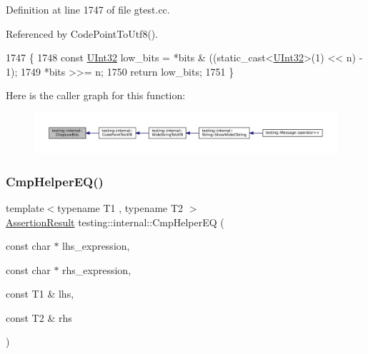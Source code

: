 Definition at line 1747 of file gtest.\+cc.



Referenced by Code\+Point\+To\+Utf8().


\begin{DoxyCode}
1747                                                \{
1748   \textcolor{keyword}{const} \hyperlink{namespacetesting_1_1internal_a40d4fffcd2bf56f18b1c380615aa85e3}{UInt32} low\_bits = *bits & ((\textcolor{keyword}{static\_cast<}\hyperlink{namespacetesting_1_1internal_a40d4fffcd2bf56f18b1c380615aa85e3}{UInt32}\textcolor{keyword}{>}(1) << n) - 1);
1749   *bits >>= n;
1750   \textcolor{keywordflow}{return} low\_bits;
1751 \}
\end{DoxyCode}
Here is the caller graph for this function\+:
\nopagebreak
\begin{figure}[H]
\begin{center}
\leavevmode
\includegraphics[width=350pt]{namespacetesting_1_1internal_a2c54b453387aa8a18f2f3e09f10b5a7d_icgraph}
\end{center}
\end{figure}
\mbox{\label{namespacetesting_1_1internal_a4638c74d9b32e971f9b321af6fafc2f1}} 
\subsubsection{\texorpdfstring{Cmp\+Helper\+E\+Q()}{CmpHelperEQ()}\hspace{0.1cm}{\footnotesize\ttfamily [1/2]}}
{\footnotesize\ttfamily template$<$typename T1 , typename T2 $>$ \\
\hyperlink{classtesting_1_1AssertionResult}{Assertion\+Result} testing\+::internal\+::\+Cmp\+Helper\+EQ (\begin{DoxyParamCaption}\item[{const char $\ast$}]{lhs\+\_\+expression,  }\item[{const char $\ast$}]{rhs\+\_\+expression,  }\item[{const T1 \&}]{lhs,  }\item[{const T2 \&}]{rhs }\end{DoxyParamCaption})}



